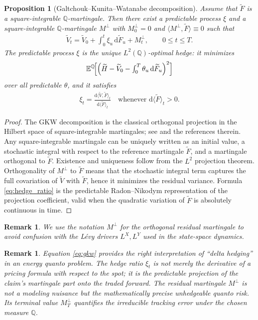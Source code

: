 \documentclass[10pt,reqno]{amsart}
\newtheorem{proposition}[theorem]{Proposition}
\newtheorem{remark}[theorem]{Remark}
\newcommand{\E}{\mathbb{E}}
\newcommand{\Q}{\mathbb{Q}}
\newcommand{\1}{\mathbbm{1}}
\newcommand{\dd}{\mathrm{d}}
\begin{document}
\begin{proposition}[Galtchouk--Kunita--Watanabe decomposition]
\label{prop:gkw}
Assume that $\widetilde{F}$ is a square-integrable $\Q$-martingale.
Then there exist a predictable process $\xi$ and a square-integrable
$\Q$-martingale $M^{\perp}$ with $M^{\perp}_0=0$ and
$\langle M^{\perp},\widetilde{F}\rangle \equiv 0$ such that
\begin{align}\label{eq:gkw}
  \widetilde{V}_t
  = \widetilde{V}_0
    + \int_0^t \xi_u\,\dd \widetilde{F}_u
    + M^{\perp}_t,
  \qquad 0 \le t \le T.
\end{align}
The predictable process $\xi$ is the unique $L^2(\Q)$-optimal hedge:
it minimizes
$$
\E^{\Q}\!\Bigl[
  \Bigl(\widetilde{H}
  - \widetilde{V}_0
  - \textstyle\int_0^T \theta_u\,\dd\widetilde{F}_u\Bigr)^2
\Bigr]
$$
over all predictable $\theta$, and it satisfies
\begin{align}\label{eq:hedge_ratio}
  \xi_t
  = \frac{\dd \langle \widetilde{V},\widetilde{F}\rangle_t}
         {\dd \langle \widetilde{F}\rangle_t}
  \quad \text{whenever } \dd \langle \widetilde{F}\rangle_t > 0.
\end{align}
\end{proposition}

\begin{proof}
The GKW decomposition is the classical orthogonal projection in the Hilbert
space of square-integrable martingales; see \citet{Sch01} and the references
therein. Any square-integrable martingale can be uniquely written as an
initial value, a stochastic integral with respect to the reference martingale
$\widetilde{F}$, and a martingale orthogonal to $\widetilde{F}$. Existence
and uniqueness follow from the $L^2$ projection theorem.
Orthogonality of $M^{\perp}$ to $\widetilde{F}$ means that
the stochastic integral term captures the full covariation of $\widetilde{V}$
with $\widetilde{F}$, hence it minimizes the residual variance. Formula
\eqref{eq:hedge_ratio} is the predictable Radon--Nikodym representation of the
projection coefficient, valid when the quadratic variation of $\widetilde{F}$
is absolutely continuous in time.
\end{proof}

\begin{remark}
We use the notation $M^{\perp}$ for the orthogonal residual martingale to
avoid confusion with the Lévy drivers $L^X, L^Y$ used in the state-space
dynamics.
\end{remark}

\begin{remark}
Equation \eqref{eq:gkw} provides the right interpretation of ``delta hedging''
in an energy quanto problem. The hedge ratio $\xi_t$ is not merely the
derivative of a pricing formula with respect to the spot; it is the predictable
projection of the claim's martingale part onto the traded forward. The residual
martingale $M^{\perp}$ is not a modeling nuisance but the mathematically
precise unhedgeable quanto risk. Its terminal value $M^{\perp}_T$ quantifies
the irreducible tracking error under the chosen measure $\Q$.
\end{remark}
\end{document}
